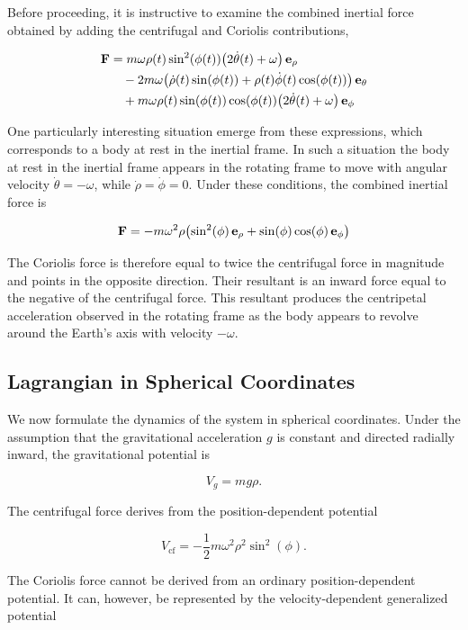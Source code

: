 \documentclass[12pt]{article}
\begin{document}
Before proceeding, it is instructive to examine the combined inertial 
force obtained by adding the centrifugal and Coriolis contributions,

\[
  \begin{aligned}
    \vb{F} &= m\omega\rho(t)\sin^2(\phi(t))\bigl(2\dot\theta(t)+\omega\bigr)\,\vb{e}_\rho \\
    &\quad - 2m\omega\bigl(\dot\rho(t)\sin(\phi(t)) + \rho(t)\dot\phi(t)\cos(\phi(t))\bigr)\,\vb{e}_\theta \\
    &\quad + m\omega\rho(t)\sin(\phi(t))\cos(\phi(t))\bigl(2\dot\theta(t)+\omega\bigr)\,\vb{e}_\phi
  \end{aligned}
\]

One particularly interesting situation emerge from these expressions, which corresponds to a body at rest in the inertial frame.
In such a situation the body at rest in the inertial frame appears in the rotating frame to move with angular velocity
$\dot\theta=-\omega$, while $\dot\rho=\dot\phi=0$. Under these conditions, the combined inertial force is

\[
  \vb{F} = -m\omega^2\rho\bigl(\sin^2(\phi)\,\vb{e}_\rho + \sin(\phi)\cos(\phi)\,\vb{e}_\phi\bigr)
\]

The Coriolis force is therefore equal to twice the centrifugal force
 in magnitude and points in the opposite direction. Their resultant is an 
 inward force equal to the negative of the centrifugal force. This 
resultant produces the centripetal acceleration observed in the rotating
 frame as the body appears to revolve around the Earth's axis with  velocity $-\omega$.\par


\subsection{Lagrangian in Spherical Coordinates}

We now formulate the dynamics of the system in spherical coordinates. Under the assumption
that the gravitational acceleration $g$ is constant and directed radially inward, the
gravitational potential is

\[
V_g = mg\rho.
\]

The centrifugal force derives from the position-dependent potential

\[
V_{\mathrm{cf}}
=
-\frac{1}{2}m\omega^2\rho^2\sin^2(\phi).
\]

The Coriolis force cannot be derived from an ordinary position-dependent potential. It can,
however, be represented by the velocity-dependent generalized potential
\end{document}
